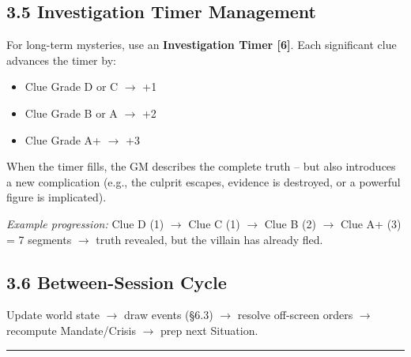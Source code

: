 \documentclass[11pt]{article}
\newcommand{\sectionrule}{\vspace{0.5em}\noindent\textcolor{gray}{\rule{\textwidth}{0.4pt}}\par\vspace{0.5em}}
\begin{document}
\subsection*{3.5 Investigation Timer Management}
For long-term mysteries, use an \textbf{Investigation Timer [6]}.  
Each significant clue advances the timer by:
\begin{itemize}
    \item Clue Grade D or C $\rightarrow$ +1
    \item Clue Grade B or A $\rightarrow$ +2
    \item Clue Grade A+ $\rightarrow$ +3
\end{itemize}
When the timer fills, the GM describes the complete truth -- but also introduces a new complication (e.g., the culprit escapes, evidence is destroyed, or a powerful figure is implicated).

\textit{Example progression:} Clue D (1) $\rightarrow$ Clue C (1) $\rightarrow$ Clue B (2) $\rightarrow$ Clue A+ (3) = 7 segments $\rightarrow$ truth revealed, but the villain has already fled.

\subsection*{3.6 Between-Session Cycle}
Update world state $\rightarrow$ draw events (\S6.3) $\rightarrow$ resolve off-screen orders $\rightarrow$ recompute Mandate/Crisis $\rightarrow$ prep next Situation.

\sectionrule
\end{document}
